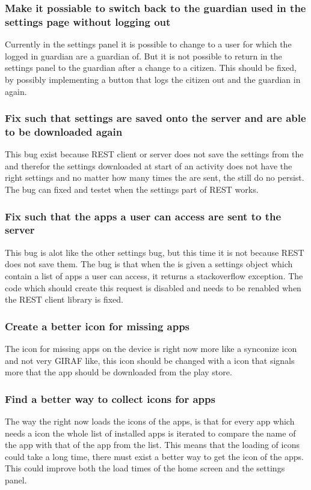 \subsubsection{Make it possiable to switch back to the guardian used in the
settings page without logging out}
Currently in the settings panel it is possible to change to a user for which
the logged in guardian are a guardian of. But it is not possible to return in the
settings panel to the guardian after a change to a citizen. This should be
fixed, by possibly implementing a button that logs the citizen out and the
guardian in again.
  
\subsubsection{Fix such that settings are saved onto the server and are able to
be downloaded again}
This bug exist because REST client or server does not save the settings from the
 and therefor the settings downloaded at start of an
activity does not have the right settings and no matter how many times the are
sent, the still do no persist. The bug can fixed and testet when the settings
part of REST works.

\subsubsection{Fix such that the apps a user can access are sent to the server}
This bug is alot like the other settings bug, but this time it is not because
REST does not save them. The bug is that when the  is
given a settings object which contain a list of apps a user can access, it
returns a stackoverflow exception. The code which should create this request is
disabled and needs to be renabled when the REST client library is fixed.

\subsubsection{Create a better icon for missing apps}
The icon for missing apps on the device is right now more like a synconize icon
and not very GIRAF like, this icon should be changed with a icon that signals
more that the app should be downloaded from the play store.

\subsubsection{Find a better way to collect icons for apps}
The way the  right now loads the icons of the apps, is that for
every app which needs a icon the whole list of installed apps is iterated to
compare the name of the app with that of the app from the list. This means that
the loading of icons could take a long time, there must exist a better way to
get the icon of the apps. This could improve both the load times of the home
screen and the settings panel.

